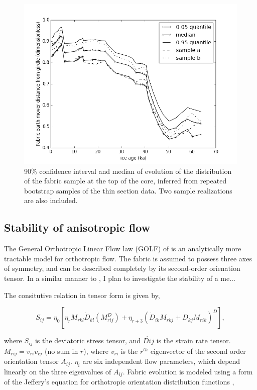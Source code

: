 \documentclass{report}
\begin{document}
\begin{figure}
\caption{90\% confidence interval and median of evolution of the distribution of the fabric sample at the top of the core, inferred from repeated bootstrap samples of the thin section data. Two sample realizations are also included.}
\includegraphics[width=12cm]{ci}
\end{figure}


\subsection{Stability of anisotropic flow}

The General Orthotropic Linear Flow law (GOLF) of \citet{gillet-chaulet2005} is an analytically more tractable model for orthotropic flow. The fabric is assumed to possess three axes of symmetry, and can be described completely by its second-order orienation tensor. In a similar manner to \citet{montgomery-smith2011}, I plan to investigate the stability of a me...

The consitutive relation in tensor form is given by,

\begin{equation}
S_{ij} = \eta_0 \left[ \eta_r M_{rkl} \dot{D}_{kl} \left( M_{rij}^D \right)  + \eta_{r+3} \left( \dot{D}_{ik} M_{rkj} + \dot{D}_{kj} M_{rik} \right)^D \right],
\end{equation}

where $S_{ij}$ is the deviatoric stress tensor, and $\dot{D{ij}}$ is the strain rate tensor. $M_{rij} = v_{ri} v_{rj}$ (no sum in $r$), where $v_{ri}$ is the $r^{th}$ eigenvector of the second order orientation tensor $A_{ij}$. $\eta_i$ are six independent flow parameters, which depend linearly on the three eigenvalues of $A_{ij}$. Fabric evolution is modeled using a form of the Jeffery's equation for orthotropic orientation distribution functions \citep{gillet-chaulet2006},
\end{document}
